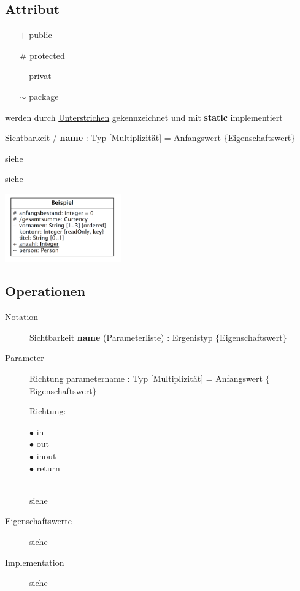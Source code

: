 \subsection{Attribut }
  \begin{description}
    \item[Sichtbarkeit]
      \begin{itemize}[leftmargin=0.5cm]
        \item[$+$] public
        \item[$\#$] protected
        \item[$-$] privat
        \item[$\sim$] package
      \end{itemize}
    \item[Klassenattribute]
      werden durch \underline{Unterstrichen} gekennzeichnet und mit \textbf{static} implementiert
    \item[Notation]
      Sichtbarkeit / \textbf{name} : Typ [Multiplizität] = Anfangswert $\lbrace$Eigenschaftswert$\rbrace$ \\
    \parbox{6cm}{
      \item[Eigenschaftswerte]
        siehe 
      \item[Implementation]
        siehe  }
    \parbox{6cm}{\includegraphics[width=5cm]{./bilder/Notation_Attribute.png}}
  \end{description}
  
  
\subsection{Operationen }
  \begin{description}
    \item[Notation]
      Sichtbarkeit \textbf{name} (Parameterliste) : Ergenistyp $\lbrace$Eigenschaftswert$\rbrace$
    \item[Parameter]
      Richtung parametername : Typ [Multiplizität] = Anfangswert $\lbrace$Eigenschaftswert$\rbrace$ \\
      \parbox[t]{2cm}{Richtung: }
      \parbox[t]{2cm}{$\bullet$ in \\ $\bullet$ out \\ $\bullet$ inout \\ $\bullet$ return} \\[6pt]
      siehe 
    \item[Eigenschaftswerte]
      siehe 
    \item[Implementation]
      siehe 
  \end{description}
  

